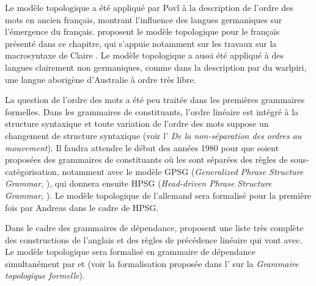 {    Le modèle topologique a été appliqué par Povl \citet{skaarup1975premieres} à la description de l’ordre des mots en ancien français, montrant l’influence des langues germaniques sur l’émergence du français. \citet{gerdes2006amas} proposent le modèle topologique pour le français présenté dans ce chapitre, qui s’appuie notamment sur les travaux sur la macrosyntaxe de Claire \citet{blanche-benveniste1990francais}. Le modèle topologique a aussi été appliqué à des langues clairement non germaniques, comme dans la description par \citet{DonohueSag1999} du warlpiri, une langue aborigène d’Australie à ordre très libre.

    La question de l’ordre des mots a été peu traitée dans les premières grammaires formelles. Dans les grammaires de constituants, l’ordre linéaire est intégré à la structure syntaxique et toute variation de l’ordre des mots suppose un changement de structure syntaxique (voir l’ \textit{De la non-séparation des ordres au mouvement}). Il faudra attendre le début des années 1980 pour que soient proposées des grammaires de constituants où les  sont séparées des règles de sous-catégorisation, notamment avec le modèle GPSG (\textit{Generalized Phrase Structure Grammar}, \citealt{gazdar1985generalized}), qui donnera ensuite HPSG (\textit{Head-driven Phrase Structure Grammar}, \citealt{PollardSag1987}). Le modèle topologique de l’allemand sera formalisé pour la première fois par Andreas \citet{kathol1995linearization-based} dans le cadre de HPSG.

    Dans le cadre des grammaires de dépendance, \citet{melcuk1987surface} proposent une liste très complète des constructions de l’anglais et des règles de précédence linéaire qui vont avec. Le modèle topologique sera formalisé en grammaire de dépendance simultanément par \citet{duchier2001topological} et \citet{gerdes2001word} (voir la formalisation proposée dans l’ sur la \textit{Grammaire topologique formelle}).
}
